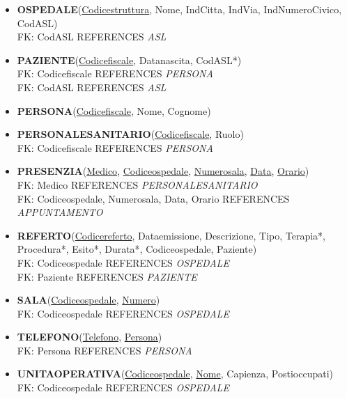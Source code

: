 \documentclass[a4paper,12pt]{report}
\begin{document}
\begin{itemize}
  \\ FK: Codice\textunderscore fiscale REFERENCES \emph{PERSONALE\textunderscore SANITARIO}
  \item \textbf{OSPEDALE}(\underline{Codice\textunderscore struttura}, Nome, Ind\textunderscore Citta, Ind\textunderscore Via, Ind\textunderscore Numero\textunderscore Civico, Cod\textunderscore ASL)
  \\ FK: Cod\textunderscore ASL REFERENCES \emph{ASL}
  \item \textbf{PAZIENTE}(\underline{Codice\textunderscore fiscale}, Data\textunderscore nascita, Cod\textunderscore ASL*)
  \\ FK: Codice\textunderscore fiscale REFERENCES \emph{PERSONA}
  \\ FK: Cod\textunderscore ASL REFERENCES \emph{ASL}
  \item \textbf{PERSONA}(\underline{Codice\textunderscore fiscale}, Nome, Cognome)
  \item \textbf{PERSONALE\textunderscore SANITARIO}(\underline{Codice\textunderscore fiscale}, Ruolo)
  \\ FK: Codice\textunderscore fiscale REFERENCES \emph{PERSONA}
  \item \textbf{PRESENZIA}(\underline{Medico}, \underline{Codice\textunderscore ospedale}, \underline{Numero\textunderscore sala}, \underline{Data}, \underline{Orario})
  \\ FK: Medico REFERENCES \emph{PERSONALE\textunderscore SANITARIO}
  \\ FK: Codice\textunderscore ospedale, Numero\textunderscore sala, Data, Orario REFERENCES \emph{APPUNTAMENTO}
  \item \textbf{REFERTO}(\underline{Codice\textunderscore referto}, Data\textunderscore emissione, Descrizione, Tipo, Terapia*, Procedura*, Esito*, Durata*, Codice\textunderscore ospedale, Paziente)
  \\ FK: Codice\textunderscore ospedale REFERENCES \emph{OSPEDALE}
  \\ FK: Paziente REFERENCES \emph{PAZIENTE}
  \item \textbf{SALA}(\underline{Codice\textunderscore ospedale}, \underline{Numero})
  \\ FK: Codice\textunderscore ospedale REFERENCES \emph{OSPEDALE}
  \item \textbf{TELEFONO}(\underline{Telefono}, \underline{Persona})
  \\ FK: Persona REFERENCES \emph{PERSONA}
  \item \textbf{UNITA\textunderscore OPERATIVA}(\underline{Codice\textunderscore ospedale}, \underline{Nome}, Capienza, Posti\textunderscore occupati)
  \\ FK: Codice\textunderscore ospedale REFERENCES \emph{OSPEDALE}
\end{itemize}
\end{document}
